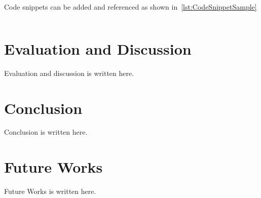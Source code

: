 Code snippets can be added and referenced as shown in~\ref{lst:CodeSnippetSample}

\begin{listing}[!ht]
    \centering
    \inputminted{csharp}{Code/SampleCode.cs}
    \caption{Code Snippet Sample}
    \label{lst:CodeSnippetSample}
\end{listing}


\chapter{Evaluation and Discussion}

Evaluation and discussion is written here.

\chapter{Conclusion}

Conclusion is written here.

\chapter{Future Works}

Future Works is written here.
